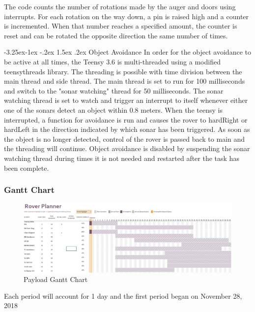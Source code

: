 \documentclass[onecolumn, draftclsnofoot, 10pt, compsoc]{IEEEtran}
\makeatletter
\renewcommand\paragraph{\@startsection{paragraph}{4}{\z@}%
                                     {-3.25ex\@plus -1ex \@minus -.2ex}%
                                     {1.5ex \@plus .2ex}%
                                     {\normalfont\normalsize\bfseries}}
\makeatother
\begin{document}
The code counts the number of rotations made by the auger and doors using interrupts. For each rotation on the way down, a pin is raised high and a counter is incremented. When that number reaches a specified amount, the counter is reset and can be rotated the opposite direction the same number of times. 

\paragraph{Object Avoidance}
In order for the object avoidance to be active at all times, the Teensy 3.6 is multi-threaded using a modified teensythreads library. The threading is possible with time division between the main thread and side thread. The main thread is set to run for 100 milliseconds and switch to the "sonar watching" thread for 50 milliseconds. The sonar watching thread is set to watch and trigger an interrupt to itself whenever either one of the sonars detect an object within 0.8 meters. When the teensy is interrupted, a function for avoidance is run and causes the rover to hardRight or hardLeft in the direction indicated by which sonar has been triggered. As soon as the object is no longer detected, control of the rover is passed back to main and the threading will continue. Object avoidance is disabled by suspending the sonar watching thread during times it is not needed and restarted after the task has been complete. 

\newpage
\begin{landscape}
\subsubsection{Gantt Chart}
\vspace{3cm}
\begin{figure}[ht]
    \centering
    \includegraphics[width = 1.3 \textwidth,angle=0]{Figures/PayloadGantz.PNG}
    \caption{Payload Gantt Chart}
    \label{fig:my_label}
\end{figure}
    Each period will account for 1 day and the first period began on November 28, 2018
\end{landscape}
\end{document}
